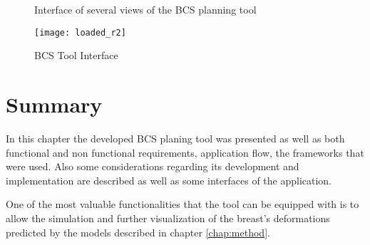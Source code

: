 \begin{figure}[!h]
\centering
{}
\caption[BCS planning tool interface]{Interface of several views of the BCS planning tool}
\label{fig:tool_interface}
\end{figure}

\begin{figure}[!h]
\centering
\texttt{[image: loaded\_r2]}
    \caption[BCS planning Tool Interface]{BCS Tool Interface}
    \label{fig:loaded_r}
\end{figure}


\section{Summary}
In this chapter the developed BCS planing tool was presented as well as both functional and non functional requirements, application flow, the frameworks that were used. Also some considerations regarding its development and implementation are described as well as some interfaces of the application.

One of the most valuable functionalities that the tool can be equipped with is to allow the simulation and further visualization of the breast's deformations predicted by the models described in chapter \ref{chap:method}.
